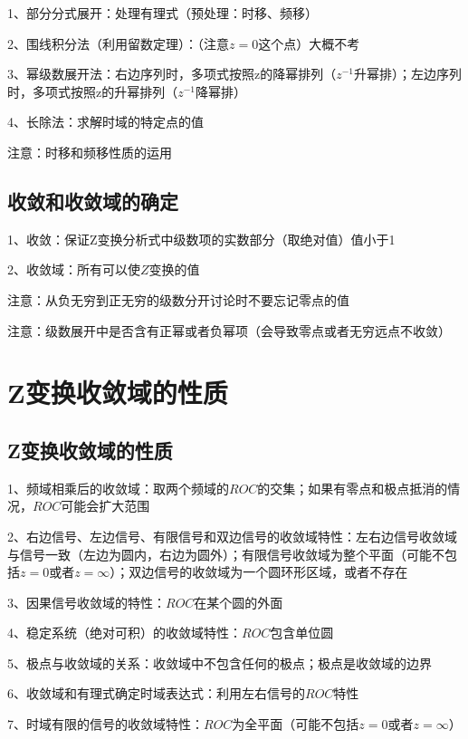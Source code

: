 1、部分分式展开：处理有理式（预处理：时移、频移）

2、围线积分法（利用留数定理）：（注意$z=0$这个点）大概不考

3、幂级数展开法：右边序列时，多项式按照z的降幂排列（$z^{-1}$升幂排）；左边序列时，多项式按照z的升幂排列（$z^{-1}$降幂排）

4、长除法：求解时域的特定点的值

注意：时移和频移性质的运用



\subsection{收敛和收敛域的确定}

1、收敛：保证Z变换分析式中级数项的实数部分（取绝对值）值小于1

2、收敛域：所有可以使$Z$变换的值

注意：从负无穷到正无穷的级数分开讨论时不要忘记零点的值

注意：级数展开中是否含有正幂或者负幂项（会导致零点或者无穷远点不收敛）

\section{Z变换收敛域的性质}



\subsection{Z变换收敛域的性质}

1、频域相乘后的收敛域：取两个频域的$ROC$的交集；如果有零点和极点抵消的情况，$ROC$可能会扩大范围

2、右边信号、左边信号、有限信号和双边信号的收敛域特性：左右边信号收敛域与信号一致（左边为圆内，右边为圆外）；有限信号收敛域为整个平面（可能不包括$z=0$或者$z=\infty$）；双边信号的收敛域为一个圆环形区域，或者不存在

3、因果信号收敛域的特性：$ROC$在某个圆的外面

4、稳定系统（绝对可积）的收敛域特性：$ROC$包含单位圆

5、极点与收敛域的关系：收敛域中不包含任何的极点；极点是收敛域的边界

6、收敛域和有理式确定时域表达式：利用左右信号的$ROC$特性

7、时域有限的信号的收敛域特性：$ROC$为全平面（可能不包括$z=0$或者$z=\infty$）

